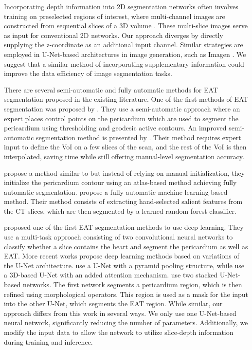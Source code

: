 Incorporating depth information into 2D segmentation networks often involves training on preselected regions of interest, where multi-channel images are constructed from sequential slices of a 3D volume \cite{wenConvolutionalNeuralNetworks2020}. These multi-slice images serve as input for conventional 2D networks. Our approach diverges by directly supplying the z-coordinate as an additional input channel. Similar strategies are employed in U-Net-based architectures in image generation, such as Imagen \cite{sahariaPhotorealisticTexttoImageDiffusion2022}. We suggest that a similar method of incorporating supplementary information could improve the data efficiency of image segmentation tasks.

There are several semi-automatic and fully automatic methods for EAT segmentation proposed in the existing literature. One of the first methods of EAT segmentation was proposed by \citet{Coppini2010}. They use a semi-automatic approach where an expert places control points on the pericardium which are used to segment the pericardium using thresholding and geodesic active contours. An improved semi-automatic segmentation method is presented by \citet{Militello2019}. Their method requires expert input to define the VoI on a few slices of the scan, and the rest of the VoI is then interpolated, saving time while still offering manual-level segmentation accuracy.

\citet{Ding2014} propose a method similar to \citet{Coppini2010} but instead of relying on manual initialization, they initialize the pericardium contour using an atlas-based method achieving fully automatic segmentation. \citet{Rodrigues2016} propose a fully automatic machine-learning-based method. Their method consists of extracting hand-selected salient features from the CT slices, which are then segmented by a learned random forest classifier.

\citet{Commandeur2018} proposed one of the first EAT segmentation methods to use deep learning. They use a multi-task approach consisting of two convolutional neural networks to classify whether a slice contains the heart and segment the pericardium as well as EAT. More recent works propose deep learning methods based on variations of the U-Net architecture. \citet{Li2019} use a U-Net with a pyramid pooling structure, while \citet{he2020} use a 3D-based U-Net with an added attention mechanism. \citet{Zhang2020} use two stacked U-Net-based networks. The first network segments a pericardium region, which is then refined using morphological operators. This region is used as a mask for the input into the other U-Net, which segments the EAT region. While similar, our approach differs from this work in several ways. We only use one U-Net-based neural network, significantly reducing the number of parameters. Additionally, we modify the input data to allow the network to utilize slice-depth information during training and inference.


